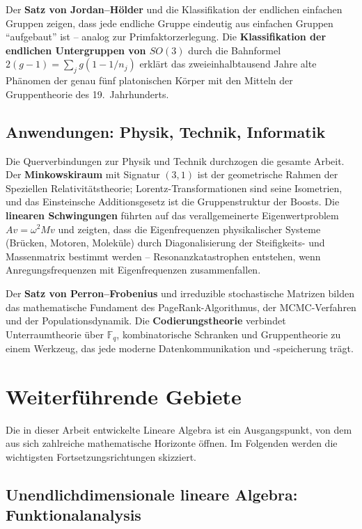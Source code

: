 ﻿\documentclass[a4paper,12pt]{report}
\theoremstyle{definition}
\begin{document}
Der \textbf{Satz von Jordan--Hölder} und die Klassifikation der
endlichen einfachen Gruppen zeigen, dass jede endliche Gruppe
eindeutig aus einfachen Gruppen ``aufgebaut'' ist -- analog zur
Primfaktorzerlegung. Die \textbf{Klassifikation der endlichen
Untergruppen von $SO(3)$} durch die Bahnformel
$2(g-1) = \sum_j g(1 - 1/n_j)$ erklärt das zweieinhalbtausend
Jahre alte Phänomen der genau fünf platonischen Körper mit den
Mitteln der Gruppentheorie des 19.~Jahrhunderts.

\subsection*{Anwendungen: Physik, Technik, Informatik}

Die Querverbindungen zur Physik und Technik durchzogen die gesamte
Arbeit. Der \textbf{Minkowskiraum} mit Signatur $(3,1)$ ist der
geometrische Rahmen der Speziellen Relativitätstheorie;
Lorentz-Transformationen sind seine Isometrien, und das
Einsteinsche Additionsgesetz ist die Gruppenstruktur der Boosts.
Die \textbf{linearen Schwingungen} führten auf das verallgemeinerte
Eigenwertproblem $Av = \omega^2 Mv$ und zeigten, dass die
Eigenfrequenzen physikalischer Systeme (Brücken, Motoren, Moleküle)
durch Diagonalisierung der Steifigkeits- und Massenmatrix bestimmt
werden -- Resonanzkatastrophen entstehen, wenn Anregungsfrequenzen
mit Eigenfrequenzen zusammenfallen.

Der \textbf{Satz von Perron--Frobenius} und irreduzible stochastische
Matrizen bilden das mathematische Fundament des PageRank-Algorithmus,
der MCMC-Verfahren und der Populationsdynamik. Die \textbf{Codierungstheorie}
verbindet Unterraumtheorie über $\mathbb{F}_q$, kombinatorische
Schranken und Gruppentheorie zu einem Werkzeug, das jede moderne
Datenkommunikation und -speicherung trägt.

\section{Weiterführende Gebiete}

Die in dieser Arbeit entwickelte Lineare Algebra ist ein
Ausgangspunkt, von dem aus sich zahlreiche mathematische
Horizonte öffnen. Im Folgenden werden die wichtigsten
Fortsetzungsrichtungen skizziert.

\subsection*{Unendlichdimensionale lineare Algebra: Funktionalanalysis}
\end{document}
